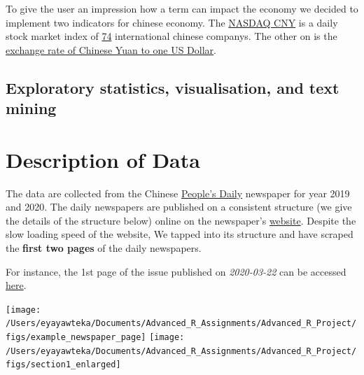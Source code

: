 \documentclass[12pt,a4paper]{article}
\let\origfigure\figure
\let\endorigfigure\endfigure
\renewenvironment{figure}[1][2] {
    \expandafter\origfigure\expandafter[H]
} {
    \endorigfigure
}
\begin{document}
To give the user an impression how a term can impact the economy we decided to implement two indicators for chinese economy. The \href{https://www.quandl.com/data/NASDAQOMX/NQCN2000CNY-NASDAQ-China-Inds-CNY-Index-NQCN2000CNY}{NASDAQ CNY} is a daily stock market index of \href{https://indexes.nasdaqomx.com/Index/Weighting/NQCN2000CNY}{74} international chinese companys. The other on is the \href{https://fred.stlouisfed.org/series/DEXCHUS}{exchange rate of Chinese Yuan to one US Dollar}.

\hypertarget{exploratory-statistics-visualisation-and-text-mining}{%
\subsection{Exploratory statistics, visualisation, and text mining}\label{exploratory-statistics-visualisation-and-text-mining}}

\hypertarget{description-of-data}{%
\section{Description of Data}\label{description-of-data}}

The data are collected from the Chinese \href{https://en.wikipedia.org/wiki/People\%27s_Daily}{People's Daily} newspaper for year 2019 and 2020. The daily newspapers are published on a consistent structure (we give the details of the structure below) online on the newspaper's \href{paper.people.com.cn}{website}. Despite the slow loading speed of the website, We tapped into its structure and have scraped the \textbf{first two pages} of the daily newspapers.

For instance, the 1st page of the issue published on \emph{2020-03-22} can be accessed \href{http://paper.people.com.cn/rmrb/html/2020-03/22/nbs.D110000renmrb_01.htm}{here}.

\begin{figure}

{\centering \texttt{[image: /Users/eyayawteka/Documents/Advanced\_R\_Assignments/Advanced\_R\_Project/figs/example\_newspaper\_page]} \texttt{[image: /Users/eyayawteka/Documents/Advanced\_R\_Assignments/Advanced\_R\_Project/figs/section1\_enlarged]} 

}

\caption{Example newspaper page published on 2020-03-22 (left), and Section or column 1 of it enlarged (right).}\label{fig:example-newspaper}
\end{figure}
\end{document}
